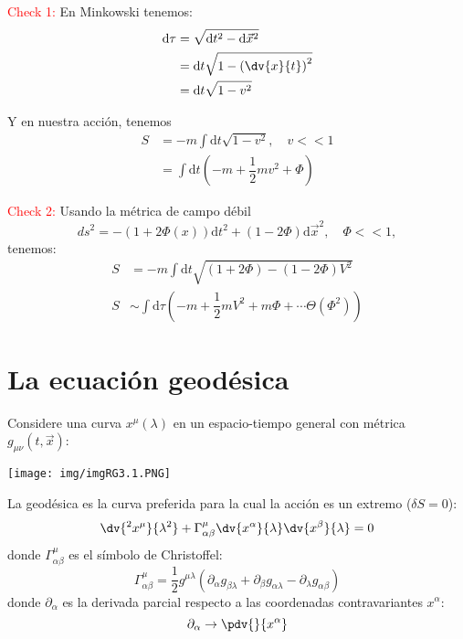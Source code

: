 \documentclass[../main]{subfiles}
\begin{document}
\begin{adjustwidth}{0pt}{-100pt}
\textcolor{red}{Check 1:} En Minkowski tenemos: 
\begin{equation}
    \begin{aligned}
        \mathrm{d}\tau&=\sqrt{\mathrm{d}t^2-\mathrm{d}\vec{x}^2}\\
        &=\mathrm{d}t\sqrt{1-\left(\dv{x}{t}\right)^2} \\
        &=\mathrm{d}t\sqrt{1-v^2}
    \end{aligned}
\end{equation}

Y en nuestra acción, tenemos 
\begin{equation}
    \begin{aligned}
        S&=-m \int \mathrm{d}t\sqrt{1-v^2},\quad v<<1 \\
        &=\int \mathrm{d}t\left(-m+\dfrac{1}{2}mv^2+\Phi\right)        
    \end{aligned}
\end{equation}

\textcolor{red}{Check 2:} Usando la métrica de campo débil
\begin{equation}
    ds^2=-(1+2\Phi(x))\mathrm{d}t^2+(1-2\Phi)\mathrm{d}\vec{x}^2,\quad \Phi<<1,
\end{equation}
tenemos:
\begin{equation}
    \begin{aligned}
        S&=-m\int \mathrm{d}t \sqrt{(1+2\Phi)-(1-2\Phi)V^2} \\
        S&\sim \int \mathrm{d}\tau \left(-m+\dfrac{1}{2}mV^2+m\Phi+\cdots \Theta(\Phi^2)\right) 
    \end{aligned}
\end{equation}

\section{La ecuación geodésica}\label{part3.3}
Considere una curva $x^{\mu}(\lambda)$ en un espacio-tiempo general con métrica $g_{\mu\nu}(t, \vec{x})$:
\begin{center}
    \texttt{[image: img/imgRG3.1.PNG]}
\end{center}
 La geodésica es la curva preferida para la cual la acción es un extremo ($\delta S=0$):
\begin{equation}
    \dv{^2 x^{\mu}}{\lambda^2}+\Gamma^{\mu}_{\alpha\beta}\dv{x^{\alpha}}{\lambda}\dv{x^{\beta}}{\lambda}=0
\end{equation}
donde $\Gamma^{\mu}_{\alpha\beta}$ es el símbolo de Christoffel:
\begin{equation}
    \Gamma^{\mu}_{\alpha\beta}=\dfrac{1}{2}g^{\mu\lambda}(\partial_{\alpha}g_{\beta\lambda}+\partial_{\beta}g_{\alpha\lambda}-\partial_{\lambda}g_{\alpha\beta})
\end{equation}
donde $\partial_{\alpha}$ es la derivada parcial respecto a las coordenadas contravariantes $x^{\alpha}$:
\begin{equation}
    \partial_{\alpha} \rightarrow \pdv{}{x^{\alpha}}
\end{equation}


\end{adjustwidth}
\end{document}
